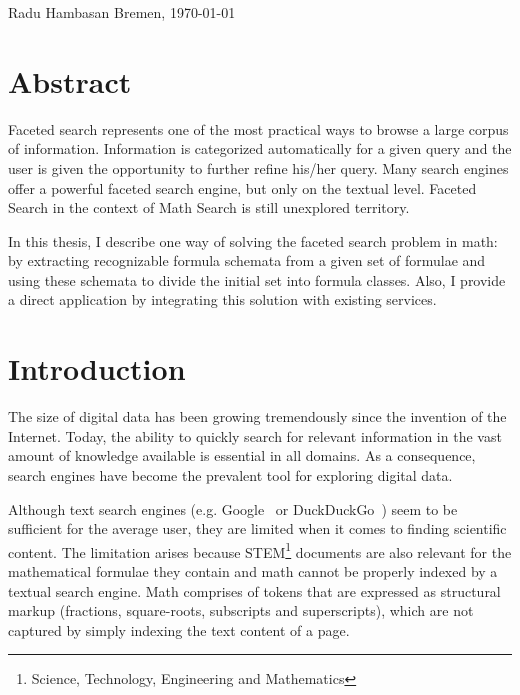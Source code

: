 \documentclass[a4paper,oneside]{article}
\begin{document}
\vspace{20mm}

Radu Hambasan \hfill Bremen, \today

\newpage

\section*{Abstract}
Faceted search represents one of the most practical ways to browse a large
corpus of information. Information is categorized automatically for
a given query and the user is given the opportunity to further refine
his/her query. Many search engines offer a powerful faceted search engine,
but only on the textual level. Faceted Search in the context of Math Search
is still unexplored territory.

In this thesis, I describe one way of solving the faceted search problem in
math: by extracting recognizable formula schemata from a given set of formulae
and using these schemata to divide the initial set into formula classes. Also,
I provide a direct application by integrating this solution with existing
services.

\tableofcontents

\clearpage {}

\section{Introduction}\label{sec:intro}

The size of digital data has been growing tremendously since the invention
of the Internet. Today, the ability to quickly search for relevant information
in the vast amount of knowledge available is essential in all domains.
As a consequence, search engines have become the prevalent tool for exploring
digital data.

Although text search engines (e.g. Google~\cite{google:online} or
DuckDuckGo~\cite{duckduckgo:online}) seem to be sufficient for the average
user, they are limited when it comes to finding scientific content. The
limitation arises because STEM\footnote{Science, Technology, Engineering and
Mathematics} documents are also relevant for the mathematical formulae they
contain and math cannot be properly indexed by a textual search engine. Math
comprises of tokens that are expressed as structural markup (fractions,
square-roots, subscripts and superscripts), which are not captured by simply
indexing the text content of a page.
\end{document}
